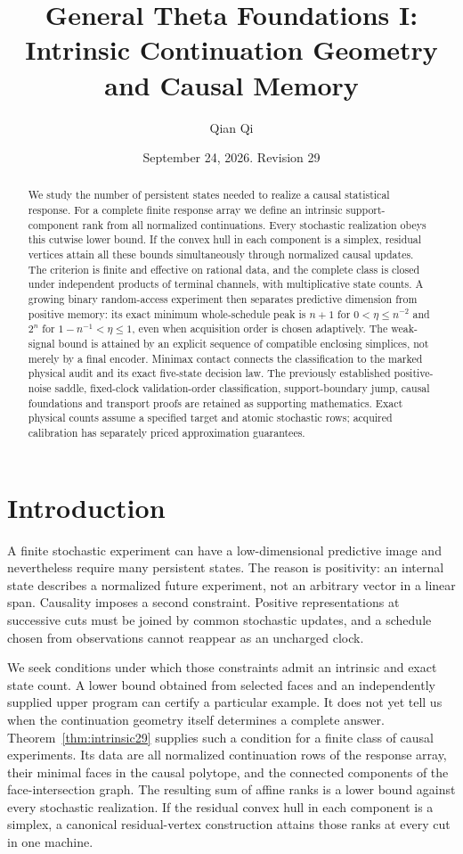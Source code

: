 \documentclass[11pt]{amsart}
\title[Intrinsic continuation geometry]{General Theta Foundations I:\\
Intrinsic Continuation Geometry and Causal Memory}
\author{Qian Qi}
\date{September 24, 2026. Revision 29}
\theoremstyle{definition}\newtheorem{definition}[theorem]{Definition}
\theoremstyle{remark}\newtheorem{remark}[theorem]{Remark}
\newcommand{\1}{\mathbf 1}
\begin{document}
\begin{abstract}
We study the number of persistent states needed to realize a causal
statistical response. For a complete finite response array we define an
intrinsic support-component rank from all normalized continuations.
Every stochastic realization obeys this cutwise lower bound. If the
convex hull in each component is a simplex, residual vertices attain
all these bounds simultaneously through normalized causal updates.
The criterion is finite and effective on rational data, and the complete
class is closed under independent products of terminal channels, with
multiplicative state counts. A growing binary random-access experiment
then separates predictive dimension from positive memory: its exact
minimum whole-schedule peak is $n+1$ for $0<\eta\le n^{-2}$ and $2^n$
for $1-n^{-1}<\eta\le1$, even when acquisition order is chosen
adaptively. The weak-signal bound is attained by an explicit sequence
of compatible enclosing simplices, not merely by a final encoder.
Minimax contact connects the classification to the marked physical
audit and its exact five-state decision law. The previously established
positive-noise saddle, fixed-clock validation-order classification,
support-boundary jump, causal foundations and transport proofs are
retained as supporting mathematics. Exact physical counts assume a
specified target and atomic stochastic rows; acquired calibration has
separately priced approximation guarantees.
\end{abstract}
\maketitle
\tableofcontents
\clearpage

\section{Introduction}
A finite stochastic experiment can have a low-dimensional predictive
image and nevertheless require many persistent states. The reason is
positivity: an internal state describes a normalized future experiment,
not an arbitrary vector in a linear span. Causality imposes a second
constraint. Positive representations at successive cuts must be joined
by common stochastic updates, and a schedule chosen from observations
cannot reappear as an uncharged clock.

We seek conditions under which those constraints admit an intrinsic
and exact state count. A lower bound obtained from selected faces and
an independently supplied upper program can certify a particular
example. It does not yet tell us when the continuation geometry itself
determines a complete answer. Theorem~\ref{thm:intrinsic29} supplies
such a condition for a finite class of causal experiments. Its data are
all normalized continuation rows of the response array, their minimal
faces in the causal polytope, and the connected components of the
face-intersection graph. The resulting sum of affine ranks is a lower
bound against every stochastic realization. If the residual convex
hull in each component is a simplex, a canonical residual-vertex
construction attains those ranks at every cut in one machine.
\end{document}
